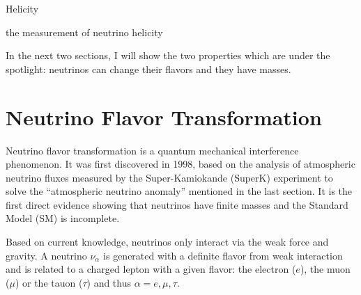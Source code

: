 Helicity

the measurement of neutrino helicity\cite{goldhaber1958helicity} 



In the next two sections, I will show the two properties which are under the spotlight: neutrinos can change their flavors and they have masses.

\section{Neutrino Flavor Transformation}
Neutrino flavor transformation is a quantum mechanical interference phenomenon\cite{akhmedov2019quantum}. It was first discovered in 1998, based on the analysis of atmospheric neutrino fluxes measured by the Super-Kamiokande (SuperK) experiment to solve the ``atmospheric neutrino anomaly'' mentioned in the last section\cite{fukuda1998evidence}. It is the first direct evidence showing that neutrinos have finite masses and the Standard Model (SM) is incomplete.

Based on current knowledge, neutrinos only interact via the weak force and gravity. A neutrino $\nu_\alpha$ is generated with a definite flavor from weak interaction and is related to a charged lepton with a given flavor: the electron ($e$), the muon ($\mu$) or the tauon ($\tau$) and thus $\alpha=e,\mu,\tau$.


